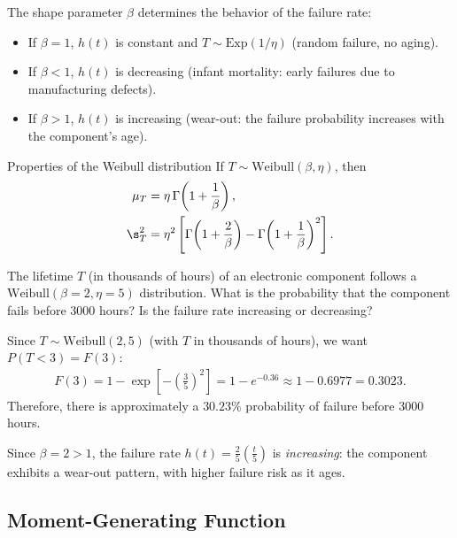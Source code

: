 \begin{observacion}
The shape parameter $\beta$ determines the behavior of the failure rate:
\begin{itemize}
 \item If $\beta = 1$, $h(t)$ is constant and $T \sim \text{Exp}(1/\eta)$ (random
 failure, no aging).
 \item If $\beta < 1$, $h(t)$ is decreasing (infant mortality: early failures due to
 manufacturing defects).
 \item If $\beta > 1$, $h(t)$ is increasing (wear-out: the failure probability
 increases with the component's age).
\end{itemize}
\end{observacion}

{Properties of the Weibull distribution} If $T \sim \text{Weibull}(\beta,\eta)$, then
\begin{align}
 \mu_T &= \eta\,\Gamma\!\left(1 + \frac{1}{\beta}\right), \\
 \s_T^2 &= \eta^2\left[\Gamma\!\left(1 + \frac{2}{\beta}\right)
 - \Gamma\!\left(1 + \frac{1}{\beta}\right)^2\right].
\end{align}

\begin{ejemplo}
 \label{exmp:2.8.8}
The lifetime $T$ (in thousands of hours) of an electronic component follows a
$\text{Weibull}(\beta=2, \eta=5)$ distribution. What is the probability that the
component fails before $3000$ hours? Is the failure rate increasing or decreasing?
\end{ejemplo}

\begin{solucion}
Since $T \sim \text{Weibull}(2,5)$ (with $T$ in thousands of hours), we want $P(T < 3) =
F(3)$:
\begin{align}
 F(3) = 1 - \exp\!\left[-\left(\frac{3}{5}\right)^2\right]
 = 1 - e^{-0.36} \approx 1 - 0.6977 = 0.3023.
\end{align}
Therefore, there is approximately a $30.23\%$ probability of failure before $3000$
hours.

Since $\beta = 2 > 1$, the failure rate $h(t) = \frac{2}{5}\left(\frac{t}{5}\right)$ is
\emph{increasing}: the component exhibits a wear-out pattern, with higher failure risk
as it ages.
\end{solucion}

\subsection{Moment-Generating Function}
\label{sec:mgf}\label{sec:3.4}

